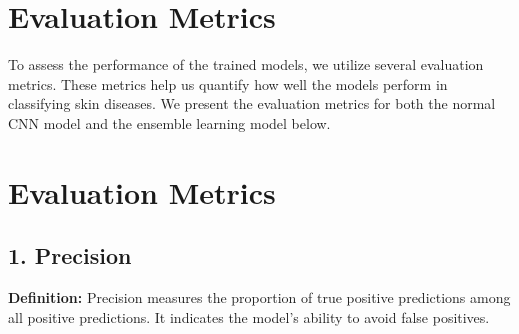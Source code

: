 \documentclass{article}
\begin{document}
\section{Evaluation Metrics}

To assess the performance of the trained models, we utilize several evaluation metrics. These metrics help us quantify how well the models perform in classifying skin diseases. We present the evaluation metrics for both the normal CNN model and the ensemble learning model below.
\section*{Evaluation Metrics}

\subsection*{1. Precision}  
\textbf{Definition:} Precision measures the proportion of true positive predictions among all positive predictions. It indicates the model's ability to avoid false positives.  
\end{document}
